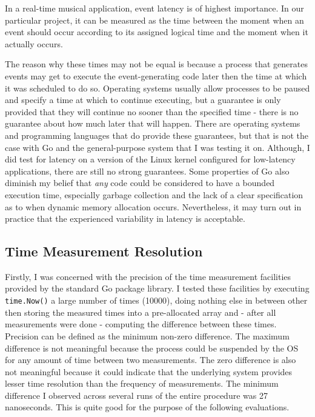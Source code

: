 \documentclass {article}
\begin{document}
In a real-time musical application, event latency is of highest importance. In
our particular project, it can be measured as the time between the moment when
an event should occur according to its assigned logical time and the moment when
it actually occurs.

The reason why these times may not be equal is because a process that generates
events may get to execute the event-generating code later then the time at which
it was scheduled to do so. Operating systems usually allow processes to be
paused and specify a time at which to continue executing, but a guarantee is
only provided that they will continue no sooner than the specified time - there
is no guarantee about how much later that will happen. There are operating
systems and programming languages that do provide these guarantees, but that is
not the case with Go and the general-purpose system that I was testing it on.
Although, I did test for latency on a version of the Linux kernel configured for
low-latency applications, there are still no strong guarantees. Some properties
of Go also diminish my belief that \emph{any} code could be considered to have a
bounded execution time, especially garbage collection and the lack of a clear
specification as to when dynamic memory allocation occurs. Nevertheless, it may
turn out in practice that the experienced variability in latency is acceptable.

\subsection{Time Measurement Resolution}

Firstly, I was concerned with the precision of the time measurement facilities
provided by the standard Go package library. I tested these facilities by
executing \lstinline|time.Now()| a large number of times (10000), doing nothing
else in between other then storing the measured times into a pre-allocated array
and - after all measurements were done - computing the difference between these
times. Precision can be defined as the minimum non-zero difference. The maximum
difference is not meaningful because the process could be suspended by the OS
for any amount of time between two measurements. The zero difference is also not
meaningful because it could indicate that the underlying system provides lesser
time resolution than the frequency of measurements. The minimum difference I
observed across several runs of the entire procedure was 27 nanoseconds. This is
quite good for the purpose of the following evaluations.
\end{document}
